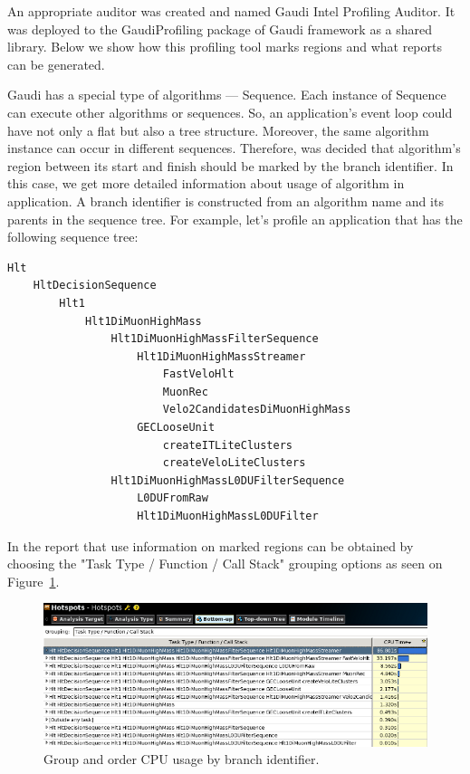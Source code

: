 \documentclass[a4paper]{jpconf}
\begin{document}
An appropriate auditor was created and named Gaudi Intel Profiling Auditor. It was deployed to the GaudiProfiling 
package of Gaudi framework as a shared library. Below we show how this profiling tool marks regions and what reports 
can be generated.

Gaudi has a special type of algorithms --- Sequence. Each instance of Sequence can execute other algorithms or 
sequences. So, an application’s event loop could have not only a flat but also a tree structure. Moreover, the same 
algorithm instance can occur in different sequences. Therefore, was decided that algorithm’s region between its start 
and finish should be marked by the branch identifier. In this case, we get more detailed information about usage of 
algorithm in application. A branch identifier is constructed from an algorithm name and its parents 
in the sequence tree. For example, let’s profile an application that has the following sequence tree:
\begin{verbatim}
Hlt 
    HltDecisionSequence 
        Hlt1 
            Hlt1DiMuonHighMass
                Hlt1DiMuonHighMassFilterSequence
                    Hlt1DiMuonHighMassStreamer
                        FastVeloHlt
                        MuonRec
                        Velo2CandidatesDiMuonHighMass
                    GECLooseUnit
                        createITLiteClusters
                        createVeloLiteClusters
                Hlt1DiMuonHighMassL0DUFilterSequence
                    L0DUFromRaw
                    Hlt1DiMuonHighMassL0DUFilter
\end{verbatim}

In \amp the report that use information on marked regions can be obtained by choosing the 
"Task Type / Function / Call Stack" grouping options as seen on Figure~\ref{fig08}.

\begin{figure}[H]
\begin{minipage}{\textwidth}
\includegraphics[width=\textwidth]{figs/fig08.png}
\caption{\label{fig08}Group and order CPU usage by branch identifier.}
\end{minipage}
\end{figure}
\end{document}
